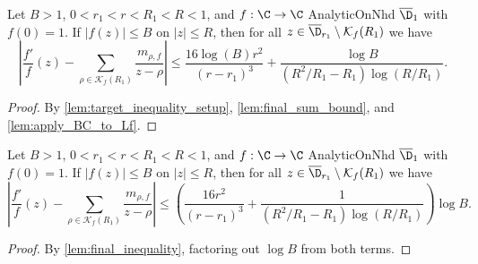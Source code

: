 \begin{lemma}\label{lem:final_inequality}  \leanok
Let $B>1$, $0<r_1<r<R_1<R<1$, and $f:\C\to\C$ AnalyticOnNhd $\overline{\D}_1$ with $f(0)=1$. If $|f(z)|\le B$ on $|z|\le R$, then for all $z\in \overline{\D}_{r_1} \setminus\mathcal K_f(R_1)$ we have
\[\left|\frac{f'}{f}(z) - \sum_{\rho\in\mathcal K_f(R_1)}\frac{m_{\rho,f}}{z-\rho}\right| \le \frac{16\log(B) r^2}{(r-r_1)^3} + \frac{\log B}{(R^2/R_1 - R_1)\log(R/R_1)}. \]
\end{lemma}
\begin{proof}
\leanok
By \cref{lem:target_inequality_setup}, \cref{lem:final_sum_bound}, and \cref{lem:apply_BC_to_Lf}.
\end{proof}


\begin{lemma}\label{lem:final_ineq1} \leanok {}
Let $B>1$, $0<r_1<r<R_1<R<1$, and $f:\C\to\C$ AnalyticOnNhd $\overline{\D}_1$ with $f(0)=1$. If $|f(z)|\le B$ on $|z|\le R$, then for all $z\in \overline{\D}_{r_1}\setminus\mathcal K_f(R_1)$ we have
\[\left|\frac{f'}{f}(z) - \sum_{\rho\in\mathcal K_f(R_1)}\frac{m_{\rho,f}}{z-\rho}\right| \le \left(\frac{16 r^2}{(r-r_1)^3} + \frac{1}{(R^2/R_1 - R_1)\log(R/R_1)}\right)\log B.\]
\end{lemma}
\begin{proof}
\leanok
By \cref{lem:final_inequality}, factoring out $\log B$ from both terms.
\end{proof}
